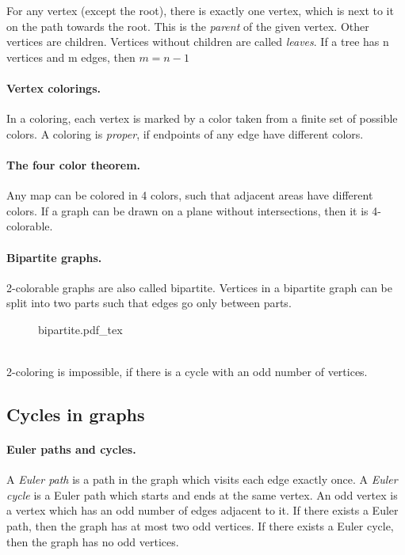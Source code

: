 \documentclass{article}
\newcommand{\incfig}[2][1]{%
    \def\svgwidth{#1\columnwidth}
    {#2.pdf_tex}
}
\begin{document}
For any vertex (except the root), there is exactly one vertex, which is next to it on the path towards the root. This is the {\it parent} of the given vertex. Other vertices are children. Vertices without children are called {\it leaves}. If a tree has n vertices and m edges, then $m=n-1$

\paragraph{Vertex colorings.}
In a coloring, each vertex is marked by a color taken from a finite set of possible colors. A coloring is {\it proper}, if endpoints of any edge have different colors.

\paragraph{The four color theorem.}
Any map can be colored in 4 colors, such that adjacent areas have different colors. If a graph can be drawn on a plane without intersections, then it is 4-colorable.

\paragraph{Bipartite graphs.}
2-colorable graphs are also called bipartite. Vertices in a bipartite graph can be split into two parts such that edges go only between parts.
\begin{figure}[h!]
  \centering
  \incfig{bipartite}
\end{figure}
\\
2-coloring is impossible, if there is a cycle with an odd number of vertices.

\subsection{Cycles in graphs}

\paragraph{Euler paths and cycles.}
A {\it Euler path} is a path in the graph which visits each edge exactly once. A {\it Euler cycle} is a Euler path which starts and ends at the same vertex. An odd vertex is a vertex which has an odd number of edges adjacent to it. If there exists a Euler path, then the graph has at most two odd vertices. If there exists a Euler cycle, then the graph has no odd vertices.
\end{document}
